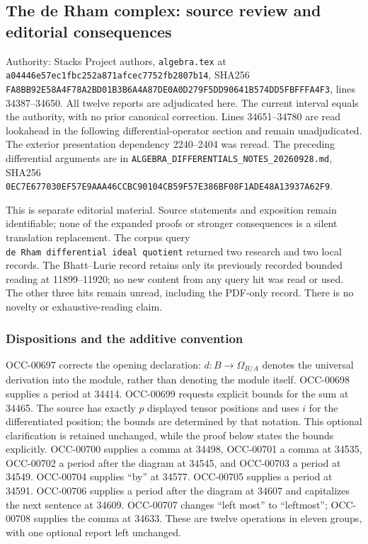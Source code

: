 \subsection{The de Rham complex: source review and editorial consequences}\label{algebra-proof-042-the-de-rham-complex-source-review-and-editorial-consequences}

Authority: Stacks Project authors, \texttt{algebra.tex} at \texttt{a04446e57ec1fbc252a871afcec7752fb2807b14}, SHA256 \texttt{FA8BB92E58A4F78A2BD01B3B6A4A87DE0A0D279F5DD90641B574DD5FBFFFA4F3}, lines 34387--34650. All twelve reports are adjudicated here. The current interval equals the authority, with no prior canonical correction. Lines 34651--34780 are read lookahead in the following differential-operator section and remain unadjudicated. The exterior presentation dependency 2240--2404 was reread. The preceding differential arguments are in \texttt{ALGEBRA\_DIFFERENTIALS\_NOTES\_20260928.md}, SHA256 \texttt{0EC7E677030EF57E9AAA46CCBC90104CB59F57E386BF08F1ADE48A13937A62F9}.

This is separate editorial material. Source statements and exposition remain identifiable; none of the expanded proofs or stronger consequences is a silent translation replacement. The corpus query \texttt{de\ Rham\ differential\ ideal\ quotient} returned two research and two local records. The Bhatt--Lurie record retains only its previously recorded bounded reading at 11899--11920; no new content from any query hit was read or used. The other three hits remain unread, including the PDF-only record. There is no novelty or exhaustive-reading claim.

\subsubsection{Dispositions and the additive convention}\label{algebra-proof-042-dispositions-and-the-additive-convention}

OCC-00697 corrects the opening declaration: \(d:B\to\Omega_{B/A}\) denotes the universal derivation into the module, rather than denoting the module itself. OCC-00698 supplies a period at 34414. OCC-00699 requests explicit bounds for the sum at 34465. The source has exactly \(p\) displayed tensor positions and uses \(i\) for the differentiated position; the bounds are determined by that notation. This optional clarification is retained unchanged, while the proof below states the bounds explicitly. OCC-00700 supplies a comma at 34498, OCC-00701 a comma at 34535, OCC-00702 a period after the diagram at 34545, and OCC-00703 a period at 34549. OCC-00704 supplies ``by'' at 34577. OCC-00705 supplies a period at 34591. OCC-00706 supplies a period after the diagram at 34607 and capitalizes the next sentence at 34609. OCC-00707 changes ``left most'' to ``leftmost''; OCC-00708 supplies the comma at 34633. These are twelve operations in eleven groups, with one optional report left unchanged.

